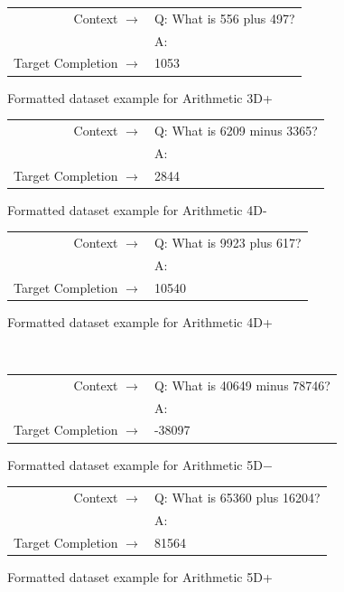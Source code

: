 \documentclass{article}
\begin{document}
\begin{figure} { \tt \footnotesize \begin{tabularx}{\linewidth}{r X} \toprule Context $\to$ & Q: What is 556 plus 497? \\
 & A: \\
 \midrule Target Completion $\to$ & 1053 \\
 \bottomrule \end{tabularx} }  \caption{Formatted dataset example for Arithmetic 3D+}  \label{eval:three_digit_addition}  \end{figure}
\begin{figure} { \tt \footnotesize \begin{tabularx}{\linewidth}{r X} \toprule Context $\to$ & Q: What is 6209 minus 3365? \\
 & A: \\
 \midrule Target Completion $\to$ & 2844 \\
 \bottomrule \end{tabularx} }  \caption{Formatted dataset example for Arithmetic 4D-}  \label{eval:four_digit_subtraction}  \end{figure}
\begin{figure} { \tt \footnotesize \begin{tabularx}{\linewidth}{r X} \toprule Context $\to$ & Q: What is 9923 plus 617? \\
 & A: \\
 \midrule Target Completion $\to$ & 10540 \\
 \bottomrule \end{tabularx} }  \caption{Formatted dataset example for Arithmetic 4D+}  \label{eval:four_digit_addition}  \end{figure}

\begin{figure}
{ \tt \footnotesize
\begin{tabularx}{\linewidth}{r X}
\toprule
Context $\to$ & Q:  What is 40649 minus 78746? \\
 & A: \\
 \midrule Target Completion $\to$ & -38097 \\
 \bottomrule \end{tabularx}
 }
 \caption{Formatted dataset example for Arithmetic 5D$-$}
 \label{eval:five_digit_subtraction}
 \end{figure}
\begin{figure} { \tt \footnotesize \begin{tabularx}{\linewidth}{r X} \toprule Context $\to$ & Q: What is 65360 plus 16204? \\
 & A: \\
 \midrule Target Completion $\to$ & 81564 \\
 \bottomrule \end{tabularx} }  \caption{Formatted dataset example for Arithmetic 5D+}  \label{eval:five_digit_addition}  \end{figure}
\end{document}
